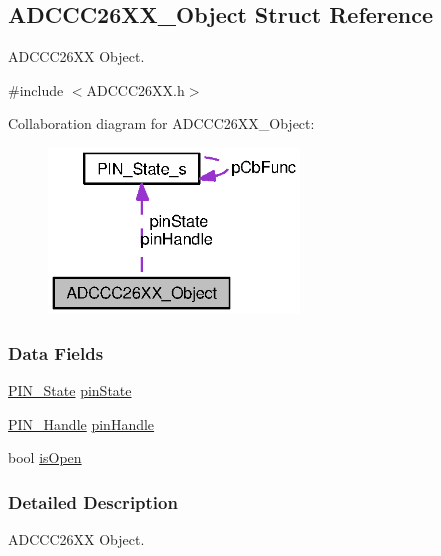 \subsection{A\+D\+C\+C\+C26\+X\+X\+\_\+\+Object Struct Reference}
\label{struct_a_d_c_c_c26_x_x___object}


A\+D\+C\+C\+C26\+X\+X Object.  




{\ttfamily \#include $<$A\+D\+C\+C\+C26\+X\+X.\+h$>$}



Collaboration diagram for A\+D\+C\+C\+C26\+X\+X\+\_\+\+Object\+:
\nopagebreak
\begin{figure}[H]
\begin{center}
\leavevmode
\includegraphics[width=189pt]{struct_a_d_c_c_c26_x_x___object__coll__graph}
\end{center}
\end{figure}
\subsubsection*{Data Fields}
\begin{DoxyCompactItemize}
\item 
\hyperlink{_p_i_n_8h_a36ef69d50df6baa6973482669c24a522}{P\+I\+N\+\_\+\+State} \hyperlink{struct_a_d_c_c_c26_x_x___object_a1cdfdc98a89833d7b4631aecadb755d7}{pin\+State}
\item 
\hyperlink{_p_i_n_8h_afb2de52b054638f63c39df1f30a0d88d}{P\+I\+N\+\_\+\+Handle} \hyperlink{struct_a_d_c_c_c26_x_x___object_ae95f4f01036f8a612134521372c767c5}{pin\+Handle}
\item 
bool \hyperlink{struct_a_d_c_c_c26_x_x___object_a6783122cf267cb0353e6ca9f519cdbc9}{is\+Open}
\end{DoxyCompactItemize}


\subsubsection{Detailed Description}
A\+D\+C\+C\+C26\+X\+X Object. 

